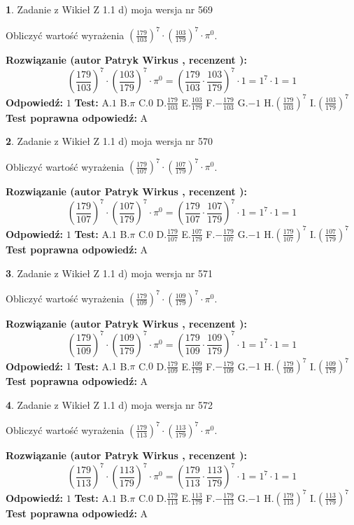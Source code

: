 \documentclass[12pt, a4paper]{article}
\theoremstyle{definition} %
\newtheorem{zad}{}
\newcommand{\zadStart}[1]{\begin{zad}#1\newline}
\newcommand{\zadStop}{\end{zad}}
\newcommand{\rozwStart}[2]{\noindent \textbf{Rozwiązanie (autor #1 , recenzent #2): }\newline}
\newcommand{\rozwStop}{\newline}
\newcommand{\odpStart}{\noindent \textbf{Odpowiedź:}\newline}
\newcommand{\odpStop}{\newline}
\newcommand{\testStart}{\noindent \textbf{Test:}\newline}
\newcommand{\testStop}{\newline}
\newcommand{\kluczStart}{\noindent \textbf{Test poprawna odpowiedź:}\newline}
\newcommand{\kluczStop}{\newline}
\begin{document}
\zadStart{Zadanie z Wikieł Z 1.1 d) moja wersja nr 569}

Obliczyć wartość wyrażenia $(\frac{179}{103})^{7} \cdot (\frac{103}{179})^{7} \cdot \pi^{0}$.
\zadStop
\rozwStart{Patryk Wirkus}{}
$$(\frac{179}{103})^{7} \cdot (\frac{103}{179})^{7} \cdot \pi^{0} = (\frac{179}{103} \cdot \frac{103}{179})^{7} \cdot 1 = 1^{7} \cdot 1 = 1$$
\rozwStop
\odpStart
$1$
\odpStop
\testStart
A.$1$ B.$\pi$ C.$0$ D.$\frac{179}{103}$ E.$\frac{103}{179}$
F.$-\frac{179}{103}$ G.$-1$
H.$(\frac{179}{103})^{7}$
I.$(\frac{103}{179})^{7}$
\testStop
\kluczStart
A
\kluczStop



\zadStart{Zadanie z Wikieł Z 1.1 d) moja wersja nr 570}

Obliczyć wartość wyrażenia $(\frac{179}{107})^{7} \cdot (\frac{107}{179})^{7} \cdot \pi^{0}$.
\zadStop
\rozwStart{Patryk Wirkus}{}
$$(\frac{179}{107})^{7} \cdot (\frac{107}{179})^{7} \cdot \pi^{0} = (\frac{179}{107} \cdot \frac{107}{179})^{7} \cdot 1 = 1^{7} \cdot 1 = 1$$
\rozwStop
\odpStart
$1$
\odpStop
\testStart
A.$1$ B.$\pi$ C.$0$ D.$\frac{179}{107}$ E.$\frac{107}{179}$
F.$-\frac{179}{107}$ G.$-1$
H.$(\frac{179}{107})^{7}$
I.$(\frac{107}{179})^{7}$
\testStop
\kluczStart
A
\kluczStop



\zadStart{Zadanie z Wikieł Z 1.1 d) moja wersja nr 571}

Obliczyć wartość wyrażenia $(\frac{179}{109})^{7} \cdot (\frac{109}{179})^{7} \cdot \pi^{0}$.
\zadStop
\rozwStart{Patryk Wirkus}{}
$$(\frac{179}{109})^{7} \cdot (\frac{109}{179})^{7} \cdot \pi^{0} = (\frac{179}{109} \cdot \frac{109}{179})^{7} \cdot 1 = 1^{7} \cdot 1 = 1$$
\rozwStop
\odpStart
$1$
\odpStop
\testStart
A.$1$ B.$\pi$ C.$0$ D.$\frac{179}{109}$ E.$\frac{109}{179}$
F.$-\frac{179}{109}$ G.$-1$
H.$(\frac{179}{109})^{7}$
I.$(\frac{109}{179})^{7}$
\testStop
\kluczStart
A
\kluczStop



\zadStart{Zadanie z Wikieł Z 1.1 d) moja wersja nr 572}

Obliczyć wartość wyrażenia $(\frac{179}{113})^{7} \cdot (\frac{113}{179})^{7} \cdot \pi^{0}$.
\zadStop
\rozwStart{Patryk Wirkus}{}
$$(\frac{179}{113})^{7} \cdot (\frac{113}{179})^{7} \cdot \pi^{0} = (\frac{179}{113} \cdot \frac{113}{179})^{7} \cdot 1 = 1^{7} \cdot 1 = 1$$
\rozwStop
\odpStart
$1$
\odpStop
\testStart
A.$1$ B.$\pi$ C.$0$ D.$\frac{179}{113}$ E.$\frac{113}{179}$
F.$-\frac{179}{113}$ G.$-1$
H.$(\frac{179}{113})^{7}$
I.$(\frac{113}{179})^{7}$
\testStop
\kluczStart
A
\kluczStop
\end{document}
